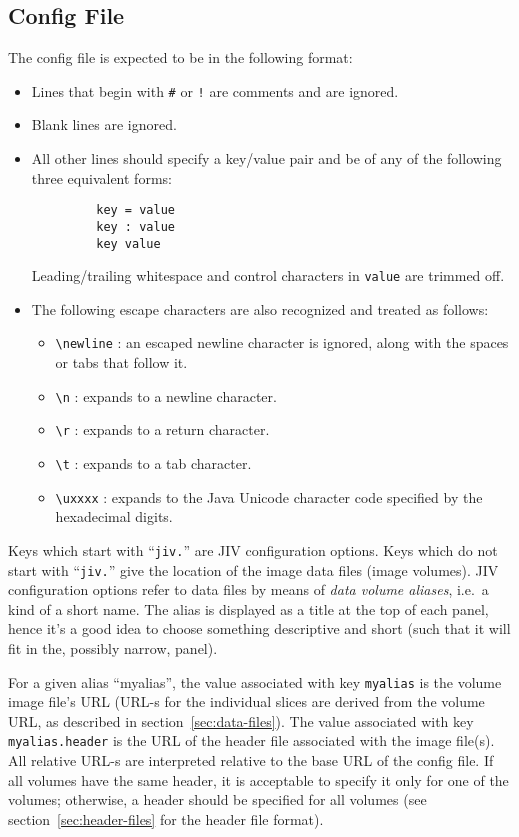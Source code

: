 \subsection{Config File}
\label{sec:config-file}

The config file is expected to be in the following format:
\begin{itemize}
\item Lines that begin with \verb|#| or \verb|!| are comments and are
  ignored. 
\item Blank lines are ignored.
\item All other lines should specify a key/value pair and be of any of
  the following three equivalent forms:
\begin{verbatim}
         key = value
         key : value
         key value
\end{verbatim}
  Leading/trailing whitespace and control characters in \verb|value|
  are trimmed off.
\item The following escape characters are also recognized and
  treated as follows: 
  \begin{itemize}
  \item \verb|\newline| : 
    an escaped newline character is ignored, along with the spaces or
    tabs that follow it. 
  \item \verb|\n| : expands to a newline character.
  \item \verb|\r| : expands to a return character.
  \item \verb|\t| : expands to a tab character.
  \item \verb|\uxxxx| : expands to the Java Unicode character code
    specified by the hexadecimal digits.  
  \end{itemize}
\end{itemize} 

Keys which start with ``\verb+jiv.+'' are JIV configuration options.
Keys which do not start with ``\verb+jiv.+'' give the location of the
image data files (image volumes). JIV configuration options refer to
data files by means of {\em data volume aliases}, i.e.\ a kind of a
short name.  The alias is displayed as a title at the top of each
panel, hence it's a good idea to choose something descriptive and
short (such that it will fit in the, possibly narrow, panel).

For a given alias ``myalias'', the value associated with key
\verb+myalias+ is the volume image file's URL (URL-s for the
individual slices are derived from the volume URL, as described in
section~\ref{sec:data-files}). The value associated with key
\verb+myalias.header+ is the URL of the header file associated with
the image file(s). All relative URL-s are interpreted relative to the
base URL of the config file.  If all volumes have the same header, it
is acceptable to specify it only for one of the volumes; otherwise, a
header should be specified for all volumes (see
section~\ref{sec:header-files} for the header file format).

